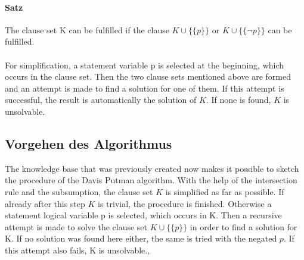 \paragraph{Satz} %
The clause set K can be fulfilled if the clause $K \cup \bigl\{\{p\}\bigr\}$ or $K \cup \bigl\{\{\neg p\}\bigr\}$ can be fulfilled.
\\
\\
For simplification, a statement variable p is selected at the beginning, which occurs in the clause set. Then the two clause sets mentioned above are formed and an attempt is made to find a solution for one of them. If this attempt is successful, the result is automatically the solution of $K$. If none is found, $K$ is unsolvable.

\subsection{Vorgehen des Algorithmus}
The knowledge base that was previously created now makes it possible to sketch the procedure of the Davis Putman algorithm. With the help of the intersection rule and the subsumption, the clause set $K$ is simplified as far as possible. If already after this step $K$ is trivial, the procedure is finished. Otherwise a statement logical variable p is selected, which occurs in K. Then a recursive attempt is made to solve the clause set $K \cup \bigl\{\{p\}\bigr\}$ in order to find a solution for K. If no solution was found here either, the same is tried with the negated $p$. If this attempt also fails, K is unsolvable.\cite{Zhang2000}, \cite{Stroetman2019}

